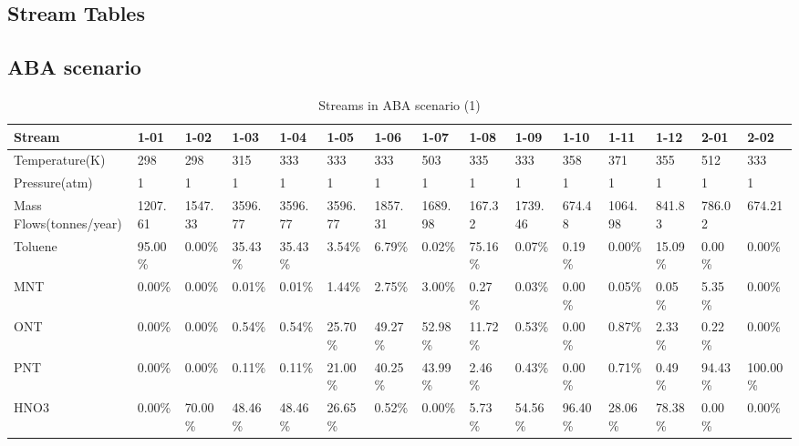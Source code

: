 \begin{landscape}


\section{Stream Tables}
\label{app:drawings}

\subsection{ABA scenario}

\begin{table}[H]
\centering
\caption{Streams in ABA scenario (1)}
\label{ABAFST1}
\begin{tabular}{|l|l|l|l|l|l|l|l|l|l|l|l|l|l|l|}
\hline
\textbf{Stream}         & 1-01    & 1-02    & 1-03    & 1-04    & 1-05    & 1-06    & 1-07    & 1-08    & 1-09    & 1-10    & 1-11    & 1-12    & 2-01    & 2-02     \\ \hline
Temperature(K)          & 298     & 298     & 315     & 333     & 333     & 333     & 503     & 335     & 333     & 358     & 371     & 355     & 512     & 333      \\ \hline
Pressure(atm)           & 1       & 1       & 1       & 1       & 1       & 1       & 1       & 1       & 1       & 1       & 1       & 1       & 1       & 1        \\ \hline
Mass Flows(tonnes/year) & 1207.61 & 1547.33 & 3596.77 & 3596.77 & 3596.77 & 1857.31 & 1689.98 & 167.32  & 1739.46 & 674.48  & 1064.98 & 841.83  & 786.02  & 674.21   \\ \hline
Toluene                 & 95.00\% & 0.00\%  & 35.43\% & 35.43\% & 3.54\%  & 6.79\%  & 0.02\%  & 75.16\% & 0.07\%  & 0.19\%  & 0.00\%  & 15.09\% & 0.00\%  & 0.00\%   \\ \hline
MNT                     & 0.00\%  & 0.00\%  & 0.01\%  & 0.01\%  & 1.44\%  & 2.75\%  & 3.00\%  & 0.27\%  & 0.03\%  & 0.00\%  & 0.05\%  & 0.05\%  & 5.35\%  & 0.00\%   \\ \hline
ONT                     & 0.00\%  & 0.00\%  & 0.54\%  & 0.54\%  & 25.70\% & 49.27\% & 52.98\% & 11.72\% & 0.53\%  & 0.00\%  & 0.87\%  & 2.33\%  & 0.22\%  & 0.00\%   \\ \hline
PNT                     & 0.00\%  & 0.00\%  & 0.11\%  & 0.11\%  & 21.00\% & 40.25\% & 43.99\% & 2.46\%  & 0.43\%  & 0.00\%  & 0.71\%  & 0.49\%  & 94.43\% & 100.00\% \\ \hline
HNO3                    & 0.00\%  & 70.00\% & 48.46\% & 48.46\% & 26.65\% & 0.52\%  & 0.00\%  & 5.73\%  & 54.56\% & 96.40\% & 28.06\% & 78.38\% & 0.00\%  & 0.00\%   \\ \hline

\end{tabular}
\end{table}
\end{landscape}
